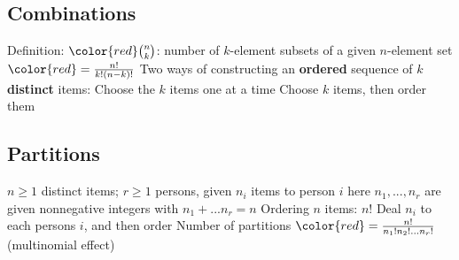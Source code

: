 \subsection{Combinations}

\begin{outline}
\1 Definition: $\color{red} \binom{n}{k}$: number of $k$-element subsets of a given $n$-element set $\color{red}=\frac{n!}{k!(n-k)!}$
\1 Two ways of constructing an \textbf{ordered} sequence of $k$ \textbf{distinct} items:
  \2 Choose the $k$ items one at a time
  \2 Choose $k$ items, then order them
\end{outline}

\subsection{Partitions}

\begin{outline}
\1 $n \geq 1$ distinct items; $r \geq 1$ persons, given $n_i$ items to person $i$
  \2 here $n_1, ..., n_r$ are given nonnegative integers
  \2 with $n_1 + ... n_r = n$
\1 Ordering $n$ items: $n!$
  \2 Deal $n_i$ to each persons $i$, and then order
\1 Number of partitions $\color{red} =\frac{n!}{n_1!n_2!...n_r!}$ (multinomial effect)
\end{outline}







